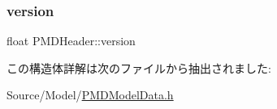\mbox{\label{struct_p_m_d_header_a790354fcbe90f7c1387e5117e0a25067}} 
\subsubsection{\texorpdfstring{version}{version}}
{\footnotesize\ttfamily float P\+M\+D\+Header\+::version}



この構造体詳解は次のファイルから抽出されました\+:\begin{DoxyCompactItemize}
\item 
Source/\+Model/\mbox{\hyperlink{_p_m_d_model_data_8h}{P\+M\+D\+Model\+Data.\+h}}\end{DoxyCompactItemize}

